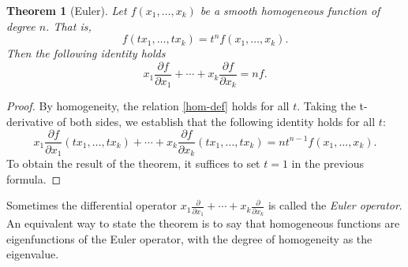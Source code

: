 \documentclass[12pt]{article}
\def\del{\partial}
\newtheorem{thm}{Theorem}
\begin{document}
%
\begin{thm}[Euler] Let $f(x_1,\ldots,x_k)$ be a smooth homogeneous function of degree $n$. That is,
\begin{equation*}
  f(t x_1, \ldots, t x_k) = t^n f(x_1, \ldots, x_k).
    \label{hom-def} \tag{*}
\end{equation*}
Then the following identity holds
\[
  x_1 \frac{\del f}{\del x_1} + \cdots + x_k \frac{\del f}{\del x_k}
    = n f.
\]
\end{thm}
\begin{proof}
By homogeneity, the relation \eqref{hom-def} holds for all $t$. Taking the t-derivative of both sides, we establish that the following identity holds for all $t$:
\[
  x_1 \frac{\del f}{\del x_1}(t x_1, \ldots, t x_k) + \cdots +
  x_k \frac{\del f}{\del x_k}(t x_1, \ldots, t x_k)
    = n t^{n-1} f(x_1, \ldots, x_k).
\]
To obtain the result of the theorem, it suffices to set $t=1$ in the previous formula.
\end{proof}

Sometimes the differential operator $\displaystyle{x_1 \frac{\del}{\del x_1} + \cdots
+ x_k \frac{\del}{\del x_k}}$ is called the \emph{Euler operator}. An equivalent way to state the theorem is to say that homogeneous functions are eigenfunctions of the Euler operator, with the degree of homogeneity as the eigenvalue.
\end{document}
